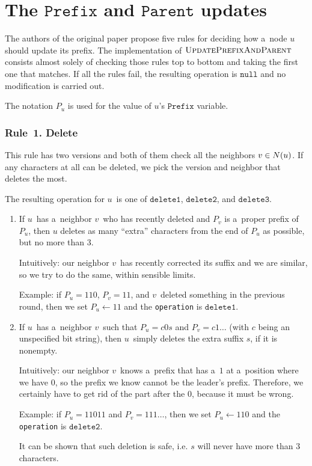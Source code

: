 \documentclass{article}
\DeclarePairedDelimiter{\parenthesesdelimiter}{(}{)}
\def\pars{\parenthesesdelimiter*}
\begin{document}
\section{The \texorpdfstring{\(\texttt{Prefix}\)}{Prefix} and \texorpdfstring{\(\texttt{Parent}\)}{Parent} updates}
The authors of the original paper propose five rules for deciding how a~node \(u\) should update its prefix. The implementation of \(\textsc{UpdatePrefixAndParent}\) consists almost solely of checking those rules top to bottom and taking the first one that matches. If all the rules fail, the resulting operation is \(\texttt{null}\) and no modification is carried out.

The notation \(P_u\) is used for the value of \(u\)'s \(\texttt{Prefix}\) variable.

\subsubsection*{Rule~1. Delete}
This rule has two versions and both of them check all the neighbors \(v \in N\pars{u}\). If any characters at all can be deleted, we pick the version and neighbor that deletes the most.

The resulting operation for \(u\)~is one of \(\texttt{delete1}\), \(\texttt{delete2}\), and \(\texttt{delete3}\).

\begin{enumerate}[label={(\alph*)}]
    \item If \(u\)~has a~neighbor \(v\)~who has recently deleted and \(P_v\) is a~proper prefix of \(P_u\), then \(u\) deletes as many ``extra'' characters from the end of \(P_u\) as possible, but no more than \(3\).
    
        Intuitively: our neighbor \(v\)~has recently corrected its suffix and we are similar, so we try to do the same, within sensible limits.
        
        Example: if \(P_u = 110\), \(P_v = 11\), and \(v\)~deleted something in the previous round, then we set \(P_u \gets 11\) and the \texttt{operation} is \(\texttt{delete1}\).
    \item If \(u\)~has a~neighbor \(v\)~such that \(P_u = c0s\) and \(P_v = c1\ldots\) (with \(c\) being an unspecified bit string), then \(u\)~simply deletes the extra suffix \(s\), if it is nonempty.
    
        Intuitively: our neighbor \(v\)~knows a~prefix that has a~\(1\) at a~position where we have \(0\), so the prefix we know cannot be the leader's prefix. Therefore, we certainly have to get rid of the part after the \(0\), because it must be wrong.
        
        Example: if \(P_u = 11011\) and \(P_v = 111\ldots\), then we set \(P_u \gets 110\) and the \texttt{operation} is \(\texttt{delete2}\).
        
        It can be shown that such deletion is safe, i.e. \(s\) will never have more than \(3\) characters.
\end{enumerate}
\end{document}
